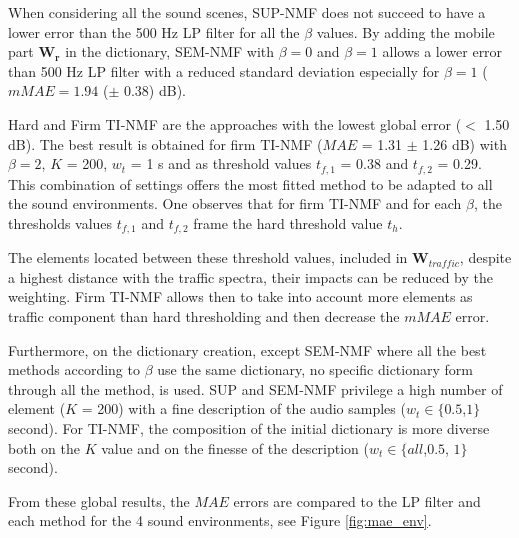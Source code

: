 \documentclass[review,5p,twocolumn,sort&compress,times]{elsarticle}
\begin{document}
When considering all the sound scenes, SUP-NMF does not succeed to have a lower error than the 500 Hz LP filter for all the $\beta$ values. By adding the mobile part $\mathbf{W_r}$ in the dictionary, SEM-NMF with $\beta = 0$ and $\beta = 1$ allows a lower error than 500 Hz LP filter with a reduced standard deviation especially for $\beta = 1$ ($mMAE = 1.94$ ($\pm$ 0.38) dB).

Hard and Firm TI-NMF are the approaches with the lowest global error ($<$ 1.50 dB). The best result is obtained for firm TI-NMF ($MAE$ = 1.31 $\pm$ 1.26 dB) with $\beta = 2$, $K$ = 200, $w_t$ = 1 s and as threshold values $t_{f,1}$ = 0.38 and $t_{f,2}$ = 0.29. This combination of settings offers the most fitted method to be adapted to all the sound environments. One observes that for firm TI-NMF and for each $\beta$, the thresholds values $t_{f,1}$ and $t_{f,2}$ frame the hard threshold value $t_h$. 

The elements located between these threshold values, included in $\mathbf{W}_{traffic}$, despite a highest distance with the traffic spectra, their impacts can be reduced by the weighting. Firm TI-NMF allows then to take into account more elements as traffic component than hard thresholding and then decrease the $mMAE$ error.


Furthermore, on the dictionary creation, except SEM-NMF where all the best methods according to $\beta$ use the same dictionary, no specific dictionary form through all the method, is used. SUP and SEM-NMF privilege a high number of element ($K$ = 200) with a fine description of the audio samples ($w_t \in \lbrace 0.5$,$1 \rbrace$ second). For TI-NMF, the composition of the initial dictionary is more diverse both on the $K$ value and on the finesse  of the description ($w_t \in \lbrace all$,$0.5$, $1 \rbrace$ second). 

From these global results, the $MAE$ errors are compared to the LP filter and each method for the 4 sound environments, see Figure \ref{fig:mae_env}. 
\end{document}
